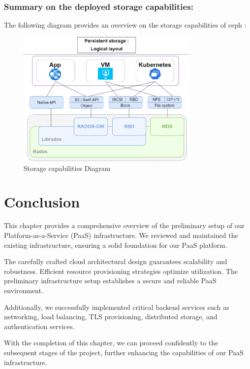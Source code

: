 \subsubsection{Summary on the deployed storage capabilities: }

The following diagram provides an overview on the storage capabilities of ceph : 
\begin{figure}[H]\centering
\includegraphics[width=0.8\textwidth,angle=00]{assets/f30.png}
\caption{Storage capabilities Diagram}
\label{fig:f30}
\end{figure}
\section{Conclusion}

This chapter provides a comprehensive overview of the preliminary setup of our Platform-as-a-Service (PaaS) infrastructure. We reviewed and maintained the existing infrastructure, ensuring a solid foundation for our PaaS platform.

The carefully crafted cloud architectural design guarantees scalability and robustness. Efficient resource provisioning strategies optimize utilization. The preliminary infrastructure setup establishes a secure and reliable PaaS environment. 

Additionally, we successfully implemented critical backend services such as networking, load balancing, TLS provisioning, distributed storage, and authentication services.

With the completion of this chapter, we can proceed confidently to the subsequent stages of the project, further enhancing the capabilities of our PaaS infrastructure.